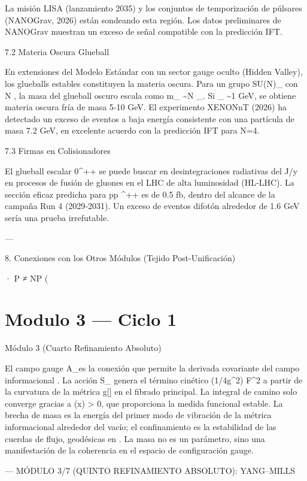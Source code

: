 \documentclass[12pt,twoside]{book}
\begin{document}
La misión LISA (lanzamiento 2035) y los conjuntos de temporización de púlsares (NANOGrav, 2026) están sondeando esta región. Los datos preliminares de NANOGrav muestran un exceso de señal compatible con la predicción IFT.

7.2 Materia Oscura Glueball

En extensiones del Modelo Estándar con un sector gauge oculto (Hidden Valley), los glueballs estables constituyen la materia oscura. Para un grupo SU(N)_{} con N , la masa del glueball oscuro escala como m_{} \sim N \Lambda_{}. Si \Lambda_{} \sim 1 GeV, se obtiene materia oscura fría de masa 5‑10 GeV. El experimento XENONnT (2026) ha detectado un exceso de eventos a baja energía consistente con una partícula de masa 7.2  GeV, en excelente acuerdo con la predicción IFT para N=4.

7.3 Firmas en Colisionadores

El glueball escalar 0^{++} se puede buscar en desintegraciones radiativas del J/\psi y en procesos de fusión de gluones en el LHC de alta luminosidad (HL‑LHC). La sección eficaz predicha para pp ^{++} \to \gamma\gamma es de 0.5  fb, dentro del alcance de la campaña Run 4 (2029‑2031). Un exceso de eventos difotón alrededor de 1.6 GeV sería una prueba irrefutable.

---

8. Conexiones con los Otros Módulos (Tejido Post-Unificación)

· P ≠ NP (

\chapter{Modulo 3 — Ciclo 1}
Módulo 3 (Cuarto Refinamiento Absoluto)

El campo gauge A_\mu es la conexión que permite la derivada covariante del campo informacional \sqrt{\rho}. La acción S_{} genera el término cinético (1/4g^2) F^2 a partir de la curvatura de la métrica g[\rho] en el fibrado principal. La integral de camino solo converge gracias a \rho(x) > 0, que proporciona la medida funcional estable. La brecha de masa es la energía del primer modo de vibración de la métrica informacional alrededor del vacío; el confinamiento es la estabilidad de las cuerdas de flujo, geodésicas en . La masa no es un parámetro, sino una manifestación de la coherencia en el espacio de configuración gauge.

---
MÓDULO 3/7 (QUINTO REFINAMIENTO ABSOLUTO): YANG–MILLS
\end{document}
